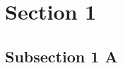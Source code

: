 \documentclass{beamer}
\begin{document}
\section{Section 1}
\subsection{Subsection 1 A}




\end{document}
